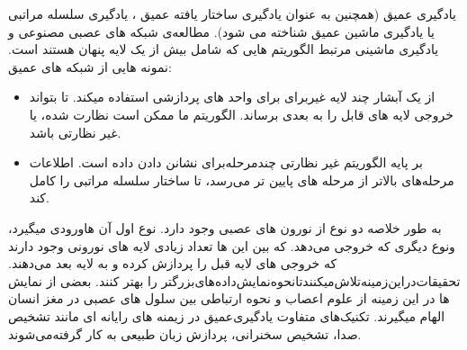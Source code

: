 یادگیری عمیق (همچنین به عنوان یادگیری ساختار یافته عمیق ،
یادگیری سلسله مراتبی یا یادگیری ماشین عمیق  شناخته می شود). مطالعه‌ی
شبکه های عصبی مصنوعی و یادگیری ماشینی مرتبط
الگوریتم هایی که شامل بیش از یک لایه پنهان هستند است. نمونه هایی از شبکه های عمیق:
\begin{itemize}
\item از یک آبشار چند لایه غیر‌برای برای واحد های پردازشی استفاده میکند. 
تا بتواند خروجی لایه های قابل را به بعدی برساند. 
الگوریتم ما ممکن است نظارت شده، یا غیر نظارتی باشد.
\item بر پایه الگوریتم غیر نظارتی چند‌مرحله‌برای نشانن دادن داده است. اطلاعات مرحله‌های بالاتر از مرحله های پایین تر می‌رسد، تا ساختار سلسله مراتبی را کامل کند.
\end{itemize}
به طور خلاصه دو نوع از نورون های عصبی وجود دارد. 
نوع اول آن ها‌ورودی میگیرد، ونوع دیگری که خروجی می‌دهد. که بین این ها تعداد زیادی لایه های نورونی وجود دارند که خروجی های لایه قبل را پردازش کرده و به لایه بعد می‌دهند. 
تحقیقات‌دراین‌زمینه‌تلاش‌میکنند‌تا‌نحوه‌نمایش‌داده‌های‌بزرگتر را بهتر کنند. بعضی از نمایش ها در این زمینه از علوم اعصاب و نحوه ارتباطی بین سلول های عصبی در مغز انسان الهام میگیرند. 
تکنیک‌های متفاوت یادگیری‌عمیق در زیمنه های رایانه ای مانند تشخیص صدا، تشخیص سخنرانی، پردازش زبان طبیعی به کار گرفته‌می‌شوند. 
